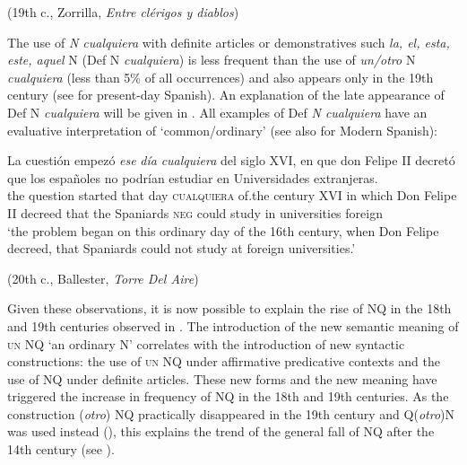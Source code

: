     (19th c., Zorrilla, \textit{Entre clérigos y diablos})
\z

The use of \textit{N cualquiera} with definite articles or demonstratives such \textit{la, el, esta, este, aquel} N (Def N \textit{cualquiera}) is less frequent than the use of \textit{un/otro} N \textit{cualquiera} (less than 5\% of all occurrences) and also appears only in the 19th century (see  for present-day Spanish). An explanation of the late appearance of Def N \textit{cualquiera} will be given in . All examples of Def \textit{N cualquiera} have an evaluative interpretation of ‘common/ordinary’ (see also  for Modern Spanish):

\ea \label{ex:key:300} %
  \gll La cuestión empezó \textit{ese} \textit{día} \textit{cualquiera} del siglo XVI, en que don Felipe II decretó que los españoles no podrían estudiar en Universidades extranjeras.\\
the question started that day \textsc{cualquiera} of.the century XVI in which Don Felipe II decreed that the Spaniards \textsc{neg} could study in universities foreign\\
  \glt ‘the problem began on this ordinary day of the 16th century, when Don Felipe decreed, that Spaniards could not study at foreign universities.’

  (20th c., Ballester, \textit{Torre Del Aire})
\z

Given these observations, it is now possible to explain the rise of NQ in the 18th and 19th centuries observed in . The introduction of the new semantic meaning of \textsc{un} NQ ‘an ordinary N’ correlates with the introduction of new syntactic constructions: the use of \textsc{un} NQ under affirmative predicative contexts and the use of NQ under definite articles. These new forms and the new meaning have triggered the increase in frequency of NQ in the 18th and 19th centuries. 
As the construction (\textit{otro}) NQ practically disappeared in the 19th century and Q(\textit{otro})N was used instead (), this explains the trend of the general fall of NQ after the 14th century (see ).

